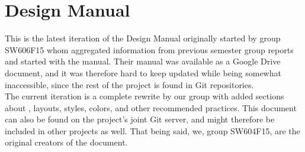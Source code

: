 
\chapter{Design Manual}
\label{app:design_manual}

This is the latest iteration of the \giraf Design Manual originally started by group SW606F15 whom aggregated information from previous semester group reports and started with the manual. Their manual was available as a Google Drive document, and it was therefore hard to keep updated while being somewhat inaccessible, since the rest of the project is found in Git repositories. \\

The current iteration is a complete rewrite by our group with added sections about \gc, layouts, styles, colors, and other recommended practices. This document can also be found on the project's joint Git server, and might therefore be included in other projects as well. That being said, we, group SW604F15, are the original creators of the document. 

